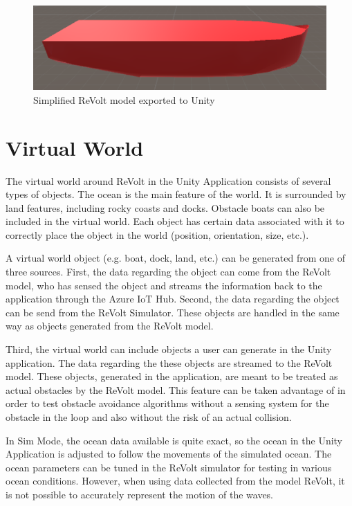 \begin{figure}[H]
\centering
\includegraphics[scale=0.6]{Images/SimplifiedModel.png}
\caption{Simplified ReVolt model exported to Unity}
\label{fig:SimplifiedReVoltModel}
\end{figure}

\section{Virtual World}
The virtual world around ReVolt in the Unity Application consists of several types of objects. The ocean is the main feature of the world. It is surrounded by land features, including rocky coasts and docks. Obstacle boats can also be included in the virtual world. Each object has certain data associated with it to correctly place the object in the world (position, orientation, size, etc.).

A virtual world object (e.g. boat, dock, land, etc.) can be generated from one of three sources. First, the data regarding the object can come from the ReVolt model, who has sensed the object and streams the information back to the application through the Azure IoT Hub. Second, the data regarding the object can be send from the ReVolt Simulator. These objects are handled in the same way as objects generated from the ReVolt model.

Third, the virtual world can include objects a user can generate in the Unity application. The data regarding the these objects are streamed to the ReVolt model. These objects, generated in the application, are meant to be treated as actual obstacles by the ReVolt model. This feature can be taken advantage of in order to test obstacle avoidance algorithms without a sensing system for the obstacle in the loop and also without the risk of an actual collision. 


In Sim Mode, the ocean data available is quite exact, so the ocean in the Unity Application is adjusted to follow the movements of the simulated ocean. The ocean parameters can be tuned in the ReVolt simulator for testing in various ocean conditions. However, when using data collected from the model ReVolt, it is not possible to accurately represent the motion of the waves.

